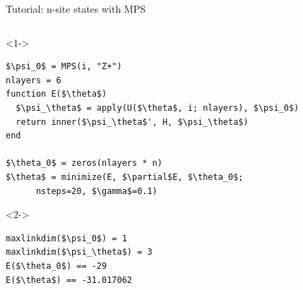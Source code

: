 \begin{frame}[fragile]{Tutorial: n-site states with MPS}

\begin{columns}

\begin{column}{5.5cm}

\begin{onlyenv}<1->
\begin{lstlisting}[language=JuliaLocal, style=julia, mathescape, basicstyle=\small]
$\psi_0$ = MPS(i, "Z+")
nlayers = 6
function E($\theta$)
  $\psi_\theta$ = apply(U($\theta$, i; nlayers), $\psi_0$)
  return inner($\psi_\theta$', H, $\psi_\theta$)
end

$\theta_0$ = zeros(nlayers * n)
$\theta$ = minimize(E, $\partial$E, $\theta_0$;
      nsteps=20, $\gamma$=0.1)
\end{lstlisting}
\end{onlyenv}

\begin{onlyenv}<2->
\begin{lstlisting}[language=JuliaLocal, style=julia, mathescape, basicstyle=\small]
maxlinkdim($\psi_0$) = 1
maxlinkdim($\psi_\theta$) = 3
E($\theta_0$) == -29
E($\theta$) == -31.017062
\end{lstlisting}
\end{onlyenv}

\end{column}

\begin{column}{4.5cm}



\end{column}
\end{columns}
\end{frame}
